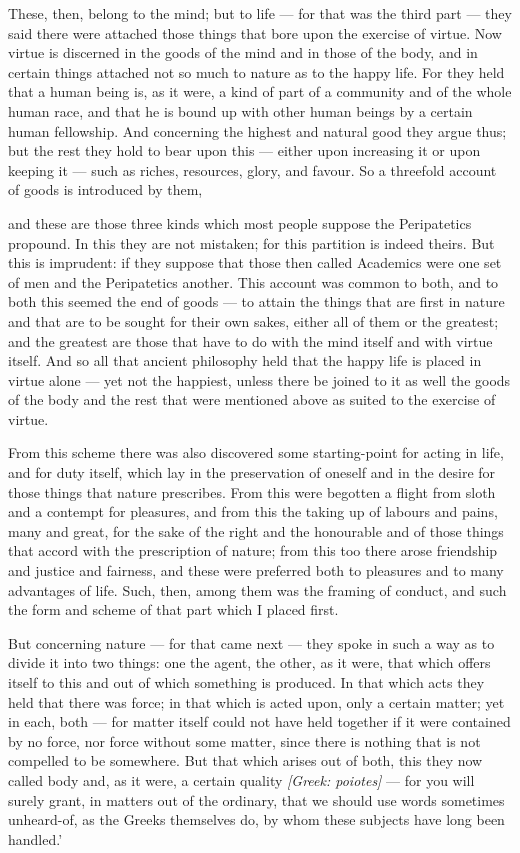  These, then, belong to the mind; but to life — for that was the third part — they said there were attached those things that bore upon the exercise of virtue. Now virtue is discerned in the goods of the mind and in those of the body, and in certain things attached not so much to nature as to the happy life. For they held that a human being is, as it were, a kind of part of a community and of the whole human race, and that he is bound up with other human beings by a certain human fellowship. And concerning the highest and natural good they argue thus; but the rest they hold to bear upon this — either upon increasing it or upon keeping it — such as riches, resources, glory, and favour. So a threefold account of goods is introduced by them,

 and these are those three kinds which most people suppose the Peripatetics propound. In this they are not mistaken; for this partition is indeed theirs. But this is imprudent: if they suppose that those then called Academics were one set of men and the Peripatetics another. This account was common to both, and to both this seemed the end of goods — to attain the things that are first in nature and that are to be sought for their own sakes, either all of them or the greatest; and the greatest are those that have to do with the mind itself and with virtue itself. And so all that ancient philosophy held that the happy life is placed in virtue alone — yet not the happiest, unless there be joined to it as well the goods of the body and the rest that were mentioned above as suited to the exercise of virtue.

 From this scheme there was also discovered some starting-point for acting in life, and for duty itself, which lay in the preservation of oneself and in the desire for those things that nature prescribes. From this were begotten a flight from sloth and a contempt for pleasures, and from this the taking up of labours and pains, many and great, for the sake of the right and the honourable and of those things that accord with the prescription of nature; from this too there arose friendship and justice and fairness, and these were preferred both to pleasures and to many advantages of life. Such, then, among them was the framing of conduct, and such the form and scheme of that part which I placed first.

 But concerning nature — for that came next — they spoke in such a way as to divide it into two things: one the agent, the other, as it were, that which offers itself to this and out of which something is produced. In that which acts they held that there was force; in that which is acted upon, only a certain matter; yet in each, both — for matter itself could not have held together if it were contained by no force, nor force without some matter, since there is nothing that is not compelled to be somewhere. But that which arises out of both, this they now called body and, as it were, a certain quality \textit{[Greek: poiotes]} — for you will surely grant, in matters out of the ordinary, that we should use words sometimes unheard-of, as the Greeks themselves do, by whom these subjects have long been handled.'

